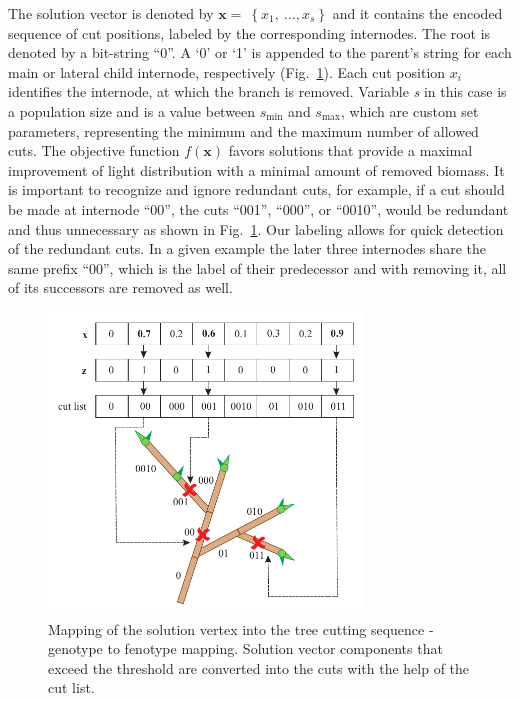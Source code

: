 The solution vector is denoted by
\(\mathbf{x} = \ \left\{ x_{1},\ \ldots,x_{s} \right\}\) and it contains
the encoded sequence of cut positions, labeled by the corresponding
internodes. The root is denoted by a bit-string ``0''. A `0' or `1' is
appended to the parent's string for each main or lateral child
internode, respectively (Fig.~\ref{fig:my_figure2}). Each cut position \(x_{i}\)
identifies the internode, at which the branch is removed. Variable
\emph{s} in this case is a population size and is a value between
\(s_{\mathrm{\min}}\) and \(s_{\mathrm{\max}}\), which are custom set
parameters, representing the minimum and the maximum number of allowed
cuts. The objective function \(f(\mathbf{x})\) favors solutions that
provide a maximal improvement of light distribution with a minimal amount
of removed biomass. It is important to recognize and ignore redundant cuts,
for example, if a cut should be made at internode ``00'', the cuts
``001'', ``000'', or ``0010'', would be redundant and thus unnecessary
as shown in Fig.~\ref{fig:my_figure2}. Our labeling allows for quick detection of the
redundant cuts. In a given example the later three internodes share the
same prefix ``00'', which is the label of their predecessor and with
removing it, all of its successors are removed as well.
\begin{figure}[hbt]
    \centering
    \includegraphics[width=3.3in]{figs/Fig2.pdf}
    \caption{Mapping of the solution vertex into the tree cutting
sequence - genotype to fenotype mapping. Solution vector components that exceed the threshold are converted into the cuts with the help of the cut list.}
    \label{fig:my_figure2}
\end{figure}

